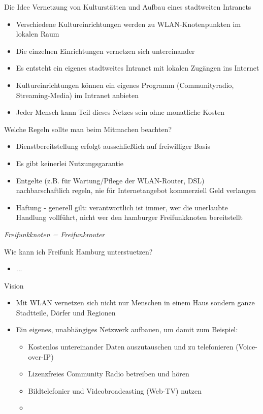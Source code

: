 \documentclass[aspectratio=43]{beamer}
\begin{document}
\begin{frame}{Die Idee}
	Vernetzung von Kulturstätten und Aufbau eines stadtweiten Intranets
	\begin{itemize}
		\item Verschiedene Kultureinrichtungen werden zu WLAN-Knotenpunkten im lokalen Raum
		\item Die einzelnen Einrichtungen vernetzen sich untereinander
		\item Es entsteht ein eigenes stadtweites Intranet mit lokalen Zugängen ins Internet
		\item Kultureinrichtungen können ein eigenes Programm (Communityradio, Streaming-Media) im Intranet anbieten
		\item Jeder Mensch kann Teil dieses Netzes sein ohne monatliche Kosten
	\end{itemize}
\end{frame}

\begin{frame}{Welche Regeln sollte man beim Mitmachen beachten?}
	\begin{itemize}
		\item Dienstbereitstellung erfolgt ausschließlich auf freiwilliger Basis
		\item Es gibt keinerlei Nutzungsgarantie
		\item Entgelte (z.B. für Wartung/Pflege der WLAN-Router, DSL) nachbarschaftlich regeln, nie für Internetangebot kommerziell Geld verlangen
		\item Haftung - generell gilt: verantwortlich ist immer, wer die unerlaubte Handlung vollführt, nicht wer den hamburger Freifunkknoten bereitstellt
	\end{itemize}
	\it{Freifunkknoten = Freifunkrouter} %
\end{frame}

\begin{frame}{Wie kann ich Freifunk Hamburg unterstuetzen?}
	\begin{itemize}
		\item ...
	\end{itemize}
\end{frame}

\begin{frame}{Vision}
	\begin{itemize}
		\item Mit WLAN vernetzen sich nicht nur Menschen in einem Haus sondern ganze Stadtteile, Dörfer und Regionen %
		\item Ein eigenes, unabhängiges Netzwerk aufbauen, um damit zum Beispiel:
		\begin{itemize}
			\item Kostenlos untereinander Daten auszutauschen und zu telefonieren (Voice-over-IP)
			\item Lizenzfreies Community Radio betreiben und hören
			\item Bildtelefonier und Videobroadcasting (Web-TV) nutzen %
			\item <deine Idee hier> %
		\end{itemize}
	\end{itemize}
\end{frame}
\end{document}
